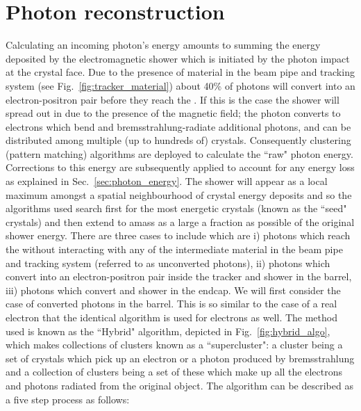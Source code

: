 \section{Photon reconstruction}
\label{sec:photon_reco}
Calculating an incoming photon's energy amounts to summing the energy deposited by the electromagnetic shower which is initiated by the photon impact at the crystal face. Due to the presence of material in the beam pipe and tracking system (see Fig.~\ref{fig:tracker_material}) about 40\% of photons will convert into an electron-positron pair before they reach the \ECAL. If this is the case the shower will spread out in \phi due to the presence of the magnetic field; the photon converts to electrons which bend and bremsstrahlung-radiate additional photons, and can be distributed among multiple (up to hundreds of) crystals. Consequently clustering (pattern matching) algorithms are deployed to calculate the ``raw" photon energy. Corrections to this energy are subsequently applied to account for any energy loss as explained in Sec.~\ref{sec:photon_energy}. The shower will appear as a local maximum amongst a spatial neighbourhood of crystal energy deposits and so the algorithms used search first for the most energetic crystals (known as the ``seed" crystals) and then extend to amass as a large a fraction as possible of the original shower energy. There are three cases to include which are i) photons which reach the \ECAL without interacting with any of the intermediate material in the beam pipe and tracking system (referred to as unconverted photons), ii) photons which convert into an electron-positron pair inside the tracker and shower in the barrel, iii) photons which convert and shower in the endcap.
We will first consider the case of converted photons in the barrel. This is so similar to the case of a real electron that the identical algorithm is used for electrons as well. The method used is known as the ``Hybrid" algorithm, depicted in Fig.~\ref{fig:hybrid_algo}, which makes collections of clusters known as a ``supercluster": a cluster being a set of crystals which pick up an electron or a photon produced by bremsstrahlung and a collection of clusters being a set of these which make up all the electrons and photons radiated from the original object. The algorithm can be described as a five step process as follows:

